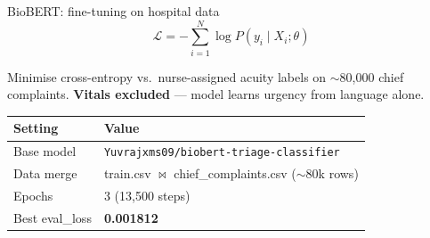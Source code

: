 \begin{frame}{BioBERT: fine-tuning on hospital data}
  \begin{equation*}
    \mathcal{L} = -\sum_{i=1}^{N} \log P(y_i \mid X_i; \theta)
  \end{equation*}

  Minimise cross-entropy vs.\ nurse-assigned acuity labels on $\sim$80,000 chief complaints.
  \textbf{Vitals excluded} --- model learns urgency from language alone.


  \footnotesize
  \begin{tabular}{@{}ll@{}}
    \toprule
    \textbf{Setting} & \textbf{Value} \\
    \midrule
    Base model & \texttt{Yuvrajxms09/biobert-triage-classifier} \\
    Data merge & train.csv $\bowtie$ chief\_complaints.csv ($\sim$80k rows) \\
    Epochs & 3 (13,500 steps) \\
    Best eval\_loss & \textbf{0.001812} \\
    \bottomrule
  \end{tabular}
\end{frame}

